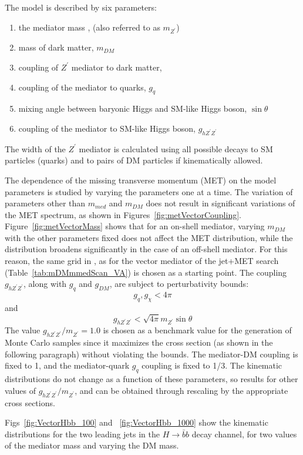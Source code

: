 The model is described by six parameters:
\begin{enumerate}
	\item the mediator mass \mmed, (also referred to as $m_{Z^\prime}$)
	\item mass of dark matter, $m_{DM}$
	\item coupling of $Z^\prime$ mediator to dark matter, \gdm
	\item coupling of the mediator to quarks, $g_q$
	\item mixing angle between baryonic Higgs and SM-like Higgs boson, $\sin\theta$
	\item coupling of the mediator to SM-like Higgs boson, $g_{hZ^\prime Z^\prime}$
\end{enumerate}
The width of the $Z^\prime$ mediator is calculated using all possible decays to SM particles (quarks) and to pairs of DM particles if kinematically allowed.

The dependence of the missing transverse momentum (MET) on the model parameters 
is studied by varying the parameters one at a time. The variation of parameters 
other than $m_{med}$ and $m_{DM}$ does not result in significant 
variations of the MET spectrum, as shown in Figures~\ref{fig:metVectorCoupling}. 
Figure~\ref{fig:metVectorMass} shows that for an on-shell mediator, 
varying $m_{DM}$ with the other parameters fixed does not affect the MET distribution, while 
the distribution broadens significantly in the case of an off-shell mediator. 
For this reason, the same grid in \mmed, \mdm as for the vector mediator
of the jet+MET search (Table~\ref{tab:mDMmmedScan_VA}) is chosen as a starting point. 
The coupling $g_{hZ^\prime Z^\prime}$, along with $g_q$ and $g_{DM}$, are subject to perturbativity bounds:
$$g_q, g_\chi < 4\pi $$ and $$  g_{h Z^\prime Z^\prime} < \sqrt{4\pi}m_{Z^\prime}\sin\theta$$ 
The value $g_{h Z^\prime Z^\prime}/m_{Z^\prime} = 1.0$ is chosen as a benchmark value for the generation 
of Monte Carlo samples since it maximizes the cross section (as shown in the following paragraph)
without violating the bounds. The mediator-DM coupling \gdm is fixed to 1, and  
the mediator-quark $g_{q}$ coupling is fixed to 1/3. 
The kinematic distributions do not change as a function of these parameters, so 
results for other values of  $g_{h Z^\prime Z^\prime}/m_{Z^\prime}$, \gdm and \gq can be 
obtained through rescaling by the appropriate cross sections. 

Figs~\ref{fig:VectorHbb_100} and ~\ref{fig:VectorHbb_1000} show the kinematic distributions for the two leading jets
in the $H \to \bar b b$ decay channel, for two values of the mediator mass and varying the DM mass.  

